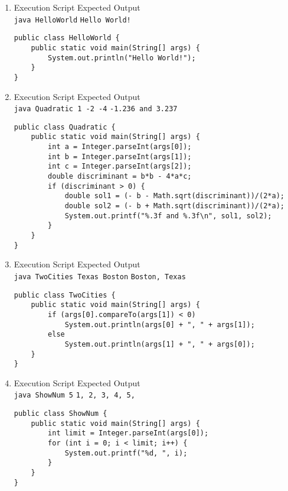 \begin{enumerate}[label=\textbf{(\alph*)}]

\item Execution Script \hfill Expected Output\\
\texttt{java HelloWorld} \hfill \texttt{Hello World!}

\lstset{language=Java,tabsize=2}
\begin{lstlisting}
public class HelloWorld {
	public static void main(String[] args) {
		System.out.println("Hello World!");
	}
}
\end{lstlisting}

\item Execution Script \hfill Expected Output\\
\texttt{java Quadratic 1 -2 -4} \hfill \texttt{-1.236 and 3.237}

\lstset{language=Java,tabsize=2}
\begin{lstlisting}
public class Quadratic {
	public static void main(String[] args) {
		int a = Integer.parseInt(args[0]);
		int b = Integer.parseInt(args[1]);
		int c = Integer.parseInt(args[2]);
		double discriminant = b*b - 4*a*c;
		if (discriminant > 0) {
			double sol1 = (- b - Math.sqrt(discriminant))/(2*a);
			double sol2 = (- b + Math.sqrt(discriminant))/(2*a);
			System.out.printf("%.3f and %.3f\n", sol1, sol2);
		}
	}
}
\end{lstlisting}

\item Execution Script \hfill Expected Output\\
\texttt{java TwoCities Texas Boston} \hfill \texttt{Boston, Texas}

\lstset{language=Java,tabsize=2}
\begin{lstlisting}
public class TwoCities {
	public static void main(String[] args) {
		if (args[0].compareTo(args[1]) < 0)
			System.out.println(args[0] + ", " + args[1]);
		else
			System.out.println(args[1] + ", " + args[0]);
	}
}
\end{lstlisting}

\newpage

\item Execution Script \hfill Expected Output\\
\texttt{java ShowNum 5} \hfill \texttt{1, 2, 3, 4, 5, }

\lstset{language=Java,tabsize=2}
\begin{lstlisting}
public class ShowNum {
	public static void main(String[] args) {
		int limit = Integer.parseInt(args[0]);
		for (int i = 0; i < limit; i++) {
			System.out.printf("%d, ", i);
		}
	}
}
\end{lstlisting}

\end{enumerate}

